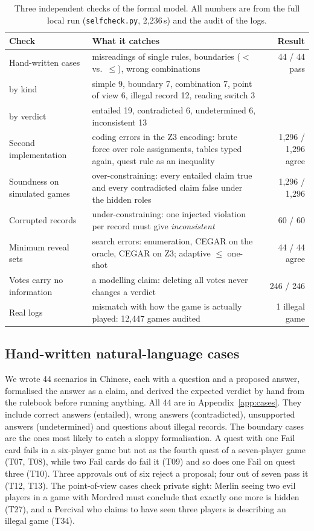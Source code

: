 \documentclass[runningheads]{llncs}
\newcommand{\vd}[1]{\emph{#1}}             %
\begin{document}
\begin{table}[!htb]
\caption{Three independent checks of the formal model. All numbers are from the full local run
(\texttt{selfcheck.py}, 2,236\,s) and the audit of the logs.}
\label{tab:validation}
\centering\scriptsize
\setlength{\tabcolsep}{3.5pt}\renewcommand{\arraystretch}{1.12}
\begin{tabularx}{\textwidth}{@{}l X r@{}}
\toprule
Check & What it catches & Result\\
\midrule
Hand-written cases & misreadings of single rules, boundaries ($<$ vs.\ $\le$), wrong combinations & 44 / 44 pass\\
\quad by kind & simple 9, boundary 7, combination 7, point of view 6, illegal record 12, reading switch 3 & \\
\quad by verdict & entailed 19, contradicted 6, undetermined 6, inconsistent 13 & \\
Second implementation & coding errors in the Z3 encoding: brute force over role assignments, tables typed again, quest rule as an inequality & 1,296 / 1,296 agree\\
Soundness on simulated games & over-constraining: every entailed claim true and every contradicted claim false under the hidden roles & 1,296 / 1,296\\
Corrupted records & under-constraining: one injected violation per record must give \vd{inconsistent} & 60 / 60\\
Minimum reveal sets & search errors: enumeration, CEGAR on the oracle, CEGAR on Z3; adaptive $\le$ one-shot & 44 / 44 agree\\
Votes carry no information & a modelling claim: deleting all votes never changes a verdict & 246 / 246\\
Real logs & mismatch with how the game is actually played: 12,447 games audited & 1 illegal game\\
\bottomrule
\end{tabularx}
\end{table}

\subsection{Hand-written natural-language cases}
We wrote 44 scenarios in Chinese, each with a question and a proposed answer, formalised the answer as a claim, and
derived the expected verdict by hand from the rulebook before running anything. All 44 are in
Appendix~\ref{app:cases}. They include correct answers (entailed), wrong answers (contradicted), unsupported answers
(undetermined) and questions about illegal records. The boundary cases are the ones most likely to catch a sloppy
formalisation. A quest with one Fail card fails in a six-player game but not as the fourth quest of a seven-player
game (T07, T08), while two Fail cards do fail it (T09) and so does one Fail on quest three (T10). Three approvals out of
six reject a proposal; four out of seven pass it (T12, T13). The point-of-view cases check private sight: Merlin
seeing two evil players in a game with Mordred must conclude that exactly one more is hidden (T27), and a Percival who
claims to have seen three players is describing an illegal game (T34).
\end{document}
